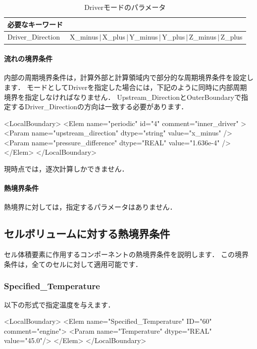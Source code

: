 \begin{table}[htdp]
\caption{Driverモードのパラメータ}
\begin{center}
\small
\begin{tabular}{ll} \toprule
必要なキーワード \\ \midrule
Driver\_Direction & X\_minus$\,|\,$X\_plus$\,|\,$Y\_minus$\,|\,$Y\_plus$\,|\,$Z\_minus$\,|\,$Z\_plus\\ \bottomrule
\end{tabular}
\end{center}
\label{tbl:parameter driver mode}
\end{table}

\paragraph{流れの境界条件}
内部の周期境界条件は，計算外部と計算領域内で部分的な周期境界条件を設定します．
モードとしてDriverを指定した場合には，下記のように同時に内部周期境界を指定しなければなりません．
Upstream\_DirectionとOuterBoundaryで指定するDriver\_Directionの方向は一致する必要があります．

{\small
\begin{program}
<LocalBoundary>
  <Elem name="periodic" id="4" comment="inner_driver" >
    <Param name="upstream_direction"  dtype="string" value="x_minus" />
    <Param name="pressure_difference" dtype="REAL"   value="1.636e-4" />
  </Elem>
</LocalBoundary>
\end{program}
}

現時点では，逐次計算しかできません．

\paragraph{熱境界条件}
熱境界に対しては，指定するパラメータはありません．


\subsection{セルボリュームに対する熱境界条件}
セル体積要素に作用するコンポーネントの熱境界条件を説明します．
この境界条件は，全てのセルに対して適用可能です．

\subsubsection{Specified\_Temperature}

以下の形式で指定温度を与えます．
{\small
\begin{program}
<LocalBoundary>
  <Elem name="Specified_Temperature" ID="60" comment="engine">
    <Param name="Temperature" dtype="REAL" value="45.0"/>
  </Elem>
</LocalBoundary>
\end{program}
}


